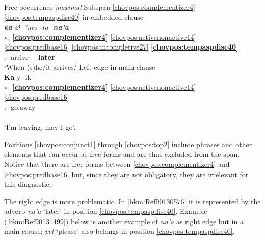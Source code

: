 \documentclass[output=paper]{langscibook}
\begin{document}
\ea  Free occurrence \textit{maximal}
    \ea\label{bkm:Ref90130576} Subspan \ref{chovpos:complementizer4}{}-\ref{chovpos:tempaspdisc40} in embedded clause\\ {
    \glll {} \textbf{\textit{ka}} \textit{Ø-} \textit{'nes-} \textit{ta-} \textbf{\textit{na'a}} \\
    v: \textbf{\ref{chovpos:complementizer4}} \ref{chovpos:activenonactive14} \ref{chovpos:predbase16} \ref{chovpos:incompletive27} \textbf{\ref{chovpos:tempaspdisc40}}\\ 
    {} \textbf{\Comp{}} \Third.\Irr{}- arrive- \Incomp{}- \textbf{later}\\
    \glt`When (s)he/it arrives.'
    }
    \ex\label{bkm:Ref90130557} Left edge in main clause\\ {
    \glll {} \textbf{Ka} y- ik\\
    v: \textbf{\ref{chovpos:complementizer4}} \ref{chovpos:activenonactive14} \ref{chovpos:predbase16}\\ 
    {} \textbf{\Comp{}} \First.\Irr{}- go.away\\\\ 
    \glt `I'm leaving, may I go'.
    }
    \z 
\z 

Positions \ref{chovpos:conjunct1} through \ref{chovpos:top2} include phrases and other elements that can occur as free forms and are thus excluded from the span. Notice that there are free forms between \ref{chovpos:complementizer4} and \ref{chovpos:predbase16} but, since they are not obligatory, they are irrelevant for this diagnostic.

The right edge is more problematic. In \ref{bkm:Ref90130576} it is represented by the adverb \textit{na'a} `later' in position \ref{chovpos:tempaspdisc40}. Example (\ref{bkm:Ref90131499}) below is another example of \textit{na'a} as right edge but in a main clause; \textit{pet} `please' also belongs in position \ref{chovpos:tempaspdisc40}.
\end{document}
